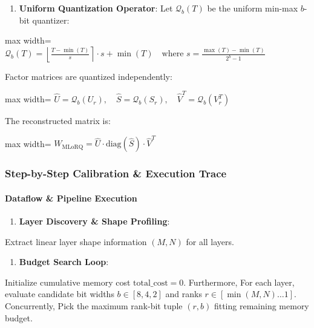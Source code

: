 \begin{enumerate}
\item \textbf{Uniform Quantization Operator}:
Let $\mathcal{Q}_b(T)$ be the uniform min-max $b$-bit quantizer:
\end{enumerate}
\begin{center}
\begin{adjustbox}{max width=\columnwidth}
$\displaystyle
\mathcal{Q}_b(T) = \left\lfloor \frac{T - \min(T)}{s} \right\rceil \cdot s + \min(T) \quad \text{where } s = \frac{\max(T) - \min(T)}{2^b - 1}
$
\end{adjustbox}
\end{center}
Factor matrices are quantized independently:
\begin{center}
\begin{adjustbox}{max width=\columnwidth}
$\displaystyle
\widehat{U} = \mathcal{Q}_b(U_r), \quad \widehat{S} = \mathcal{Q}_b(S_r), \quad \widehat{V}^T = \mathcal{Q}_b(V_r^T)
$
\end{adjustbox}
\end{center}
The reconstructed matrix is:
\begin{center}
\begin{adjustbox}{max width=\columnwidth}
$\displaystyle
W_{\text{MLoRQ}} = \widehat{U} \cdot \text{diag}(\widehat{S}) \cdot \widehat{V}^T
$
\end{adjustbox}
\end{center}


\subsubsection*{Step-by-Step Calibration \& Execution Trace}

\paragraph{Dataflow \& Pipeline Execution}

\begin{enumerate}
\item \textbf{Layer Discovery \& Shape Profiling}:
\end{enumerate}
Extract linear layer shape information $(M, N)$ for all layers.

\begin{enumerate}
\item \textbf{Budget Search Loop}:
\end{enumerate}
Initialize cumulative memory cost $\text{total\_cost} = 0$. Furthermore, For each layer, evaluate candidate bit widths $b \in [8, 4, 2]$ and ranks $r \in [\min(M, N) \dots 1]$. Concurrently, Pick the maximum rank-bit tuple $(r, b)$ fitting remaining memory budget.

